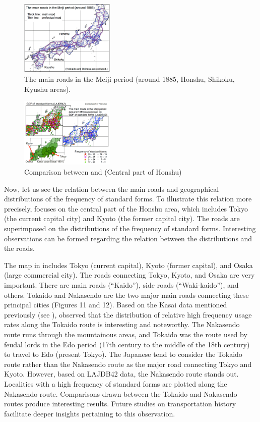\documentclass[output=paper]{LSP/langsci}
\begin{document}
\begin{figure}
\includegraphics[width=0.4\textwidth]{illustrations/kuma_fig07}
\caption{The main roads in the Meiji period (around 1885, Honshu, Shikoku, Kyushu areas).}          
\label{fig:7}
\end{figure} 
\begin{figure}
\includegraphics[width=0.4\textwidth]{illustrations/kuma_fig08}
\caption{Comparison between  and  (Central part of Honshu)}          
\label{fig:8}
\end{figure} 

Now, let us see the relation between the main roads and geographical distributions of the frequency of standard forms. To illustrate this relation more precisely,  focuses on the central part of the Honshu area, which includes Tokyo (the current capital city) and Kyoto (the former capital city). The roads are superimposed on the distributions of the frequency of standard forms. Interesting observations can be formed regarding the relation between the distributions and the roads.

The map in  includes Tokyo (current capital), Kyoto (former capital), and Osaka (large commercial city). The roads connecting Tokyo, Kyoto, and Osaka are very important. There are main roads (“Kaido”), side roads (“Waki-kaido”), and others. Tokaido and Nakasendo are the two major main roads connecting these principal cities (Figures 11 and 12). Based on the Kasai data mentioned previously (see ), \citet[184]{tanaka_hyojungo:_1991} observed that the distribution of relative high frequency usage rates along the Tokaido route is interesting and noteworthy. The Nakasendo route runs through the mountainous areas, and Tokaido was the route used by feudal lords in the Edo period (17th century to the middle of the 18th century) to travel to Edo (present Tokyo). The Japanese tend to consider the Tokaido route rather than the Nakasendo route as the major road connecting Tokyo and Kyoto. However, based on LAJDB42 data, the Nakasendo route stands out. Localities with a high frequency of standard forms are plotted along the Nakasendo route. Comparisons drawn between the Tokaido and Nakasendo routes produce interesting results. Future studies on transportation history facilitate deeper insights pertaining to this observation.
\end{document}
